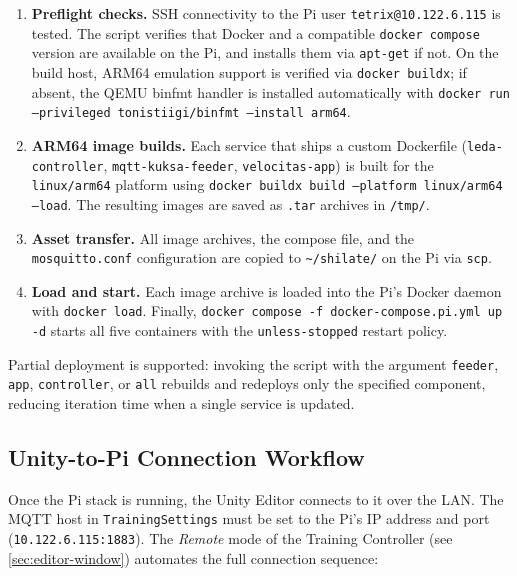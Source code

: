 \begin{enumerate}[leftmargin=2cm,topsep=1.15pt,itemsep=1.15pt,partopsep=1.15pt,parsep=1.15pt]
  \item \textbf{Preflight checks.} SSH connectivity to the Pi user
    \texttt{tetrix@10.122.6.115} is tested. The script verifies that
    Docker and a compatible \texttt{docker compose} version are available
    on the Pi, and installs them via \texttt{apt-get} if not.
    On the build host, ARM64 emulation support is verified via
    \texttt{docker buildx}; if absent, the QEMU binfmt handler is
    installed automatically with
    \texttt{docker run --privileged tonistiigi/binfmt --install arm64}.
  \item \textbf{ARM64 image builds.} Each service that ships a custom
    Dockerfile (\texttt{leda-controller}, \texttt{mqtt-kuksa-feeder},
    \texttt{velocitas-app}) is built for the \texttt{linux/arm64}
    platform using \texttt{docker buildx build --platform linux/arm64
    --load}. The resulting images are saved as \texttt{.tar} archives
    in \texttt{/tmp/}.
  \item \textbf{Asset transfer.} All image archives, the compose file,
    and the \texttt{mosquitto.conf} configuration are copied to
    \texttt{\textasciitilde/shilate/} on the Pi via \texttt{scp}.
  \item \textbf{Load and start.} Each image archive is loaded into
    the Pi's Docker daemon with \texttt{docker load}. Finally,
    \texttt{docker compose -f docker-compose.pi.yml up -d} starts
    all five containers with the \texttt{unless-stopped} restart
    policy.
\end{enumerate}

Partial deployment is supported: invoking the script with the argument
\texttt{feeder}, \texttt{app}, \texttt{controller}, or \texttt{all}
rebuilds and redeploys only the specified component, reducing iteration
time when a single service is updated.

\subsection{Unity-to-Pi Connection Workflow}
\label{sec:unity-pi}

Once the Pi stack is running, the Unity Editor connects to it over the
LAN. The MQTT host in \texttt{TrainingSettings} must be set to the
Pi's IP address and port (\texttt{10.122.6.115:1883}). The
\textit{Remote} mode of the Training Controller
(see \cref{sec:editor-window}) automates the full connection sequence:

